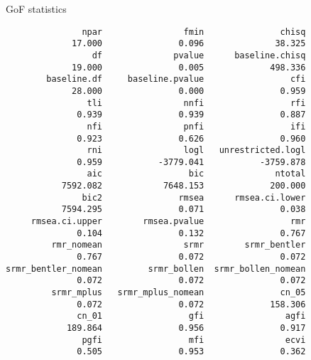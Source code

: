 \documentclass[10pt,ignorenonframetext,]{beamer}
\begin{document}
\begin{frame}[fragile]{GoF statistics}

\tiny

\begin{verbatim}
               npar                fmin               chisq 
             17.000               0.096              38.325 
                 df              pvalue      baseline.chisq 
             19.000               0.005             498.336 
        baseline.df     baseline.pvalue                 cfi 
             28.000               0.000               0.959 
                tli                nnfi                 rfi 
              0.939               0.939               0.887 
                nfi                pnfi                 ifi 
              0.923               0.626               0.960 
                rni                logl   unrestricted.logl 
              0.959           -3779.041           -3759.878 
                aic                 bic              ntotal 
           7592.082            7648.153             200.000 
               bic2               rmsea      rmsea.ci.lower 
           7594.295               0.071               0.038 
     rmsea.ci.upper        rmsea.pvalue                 rmr 
              0.104               0.132               0.767 
         rmr_nomean                srmr        srmr_bentler 
              0.767               0.072               0.072 
srmr_bentler_nomean         srmr_bollen  srmr_bollen_nomean 
              0.072               0.072               0.072 
         srmr_mplus   srmr_mplus_nomean               cn_05 
              0.072               0.072             158.306 
              cn_01                 gfi                agfi 
            189.864               0.956               0.917 
               pgfi                 mfi                ecvi 
              0.505               0.953               0.362 
\end{verbatim}

\end{frame}
\end{document}
